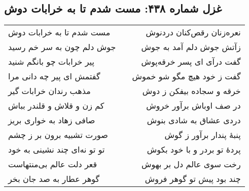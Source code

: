 \begin{center}
\section*{غزل شماره ۴۳۸: مست شدم تا به خرابات دوش}
\label{sec:438}
\begin{longtable}{l p{0.5cm} r}
مست شدم تا به خرابات دوش
&&
نعره‌زنان رقص‌کنان دردنوش
\\
جوش دلم چون به سر خم رسید
&&
زآتش جوش دلم آمد به جوش
\\
پیر خرابات چو بانگم شنید
&&
گفت درآی ای پسر خرقه‌پوش
\\
گفتمش ای پیر چه دانی مرا
&&
گفت ز خود هیچ مگو شو خموش
\\
مذهب رندان خرابات گیر
&&
خرقه و سجاده بیفکن ز دوش
\\
کم زن و قلاش و قلندر بباش
&&
در صف اوباش برآور خروش
\\
صافی زهاد به خواری بریز
&&
دردی عشاق به شادی بنوش
\\
صورت تشبیه برون بر ز چشم
&&
پنبهٔ پندار برآور ز گوش
\\
تو تو نه‌ای چند نشینی به خود
&&
پردهٔ تو بردر و با خود بکوش
\\
قعر دلت عالم بی‌منتهاست
&&
رخت سوی عالم دل بر بهوش
\\
گوهر عطار به صد جان بخر
&&
چند بود پیش تو گوهر فروش
\\
\end{longtable}
\end{center}
